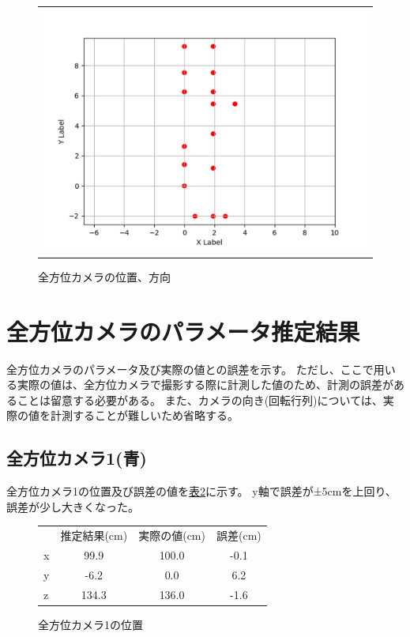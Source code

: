 \documentclass[]{jarticle}          %
\begin{document}
\begin{figure}[H]
  \begin{center}
    \begin{tabular}{c}
      \includegraphics[keepaspectratio, scale=0.3]{figures/plot_campos.png}
    \end{tabular}
  \end{center}
  \caption{全方位カメラの位置、方向}
  \label{one}
\end{figure}

\section{全方位カメラのパラメータ推定結果}
全方位カメラのパラメータ及び実際の値との誤差を示す。
ただし、ここで用いる実際の値は、全方位カメラで撮影する際に計測した値のため、計測の誤差があることは留意する必要がある。
また、カメラの向き(回転行列)については、実際の値を計測することが難しいため省略する。
\subsection{全方位カメラ1(青)}
全方位カメラ1の位置及び誤差の値を\hyperref[table1]{表\ref{table1}}に示す。
y軸で誤差が±5cmを上回り、誤差が少し大きくなった。
\begin{figure}[H]
  \begin{center}
    \begin{tabular}{lccc}
    & 推定結果(cm) & 実際の値(cm) & 誤差(cm) \\
    x & 99.9 & 100.0 & -0.1 \\
    y & -6.2 & 0.0 & 6.2 \\
    z & 134.3 & 136.0 & -1.6
    \end{tabular}
  \end{center}
  \caption{全方位カメラ1の位置}
  \label{table1}
\end{figure}
\end{document}
